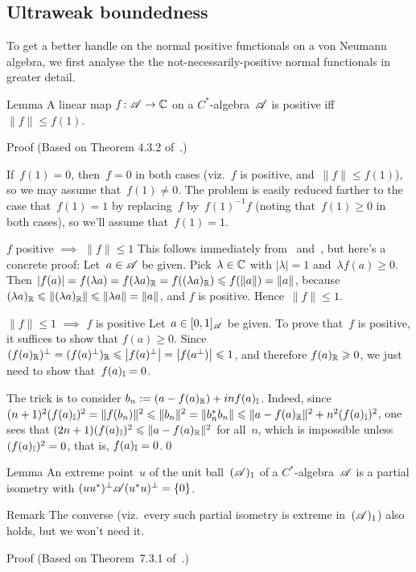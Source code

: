 \documentclass[a]{subfiles}
\begin{document}
\subsection{Ultraweak boundedness}
\begin{parsec}%
\begin{point}%
To get a better handle on the normal positive functionals
on a von Neumann algebra,
we first analyse the the not-necessarily-positive normal functionals
in greater detail.
\end{point}
\begin{point}{Lemma}%
A linear map $f\colon \mathscr{A}\to \mathbb{C}$
on a $C^*$-algebra~$\mathscr{A}$
is positive iff $\|f\|\leq f(1)$.
\begin{point}{Proof}%
(Based on Theorem 4.3.2 of~\cite{kr}.)

If~$f(1)=0$, then~$f=0$ in both cases 
(viz.~$f$ is positive, and~$\|f\|\leq f(1)$),
so
we may assume that~$f(1)\neq 0$.
The problem is easily reduced farther to the case 
that~$f(1)=1$
by replacing~$f$ by~$f(1)^{-1}f$
(noting that~$f(1)\geq 0$ in both cases),
so we'll assume that~$f(1)=1$.

\begin{point}{$f$ positive $\implies$ $\|f\|\leq 1$}%
This follows
immediately from~ and~,
but here's a concrete proof:
Let~$a\in \mathscr{A}$ be given.
Pick~$\lambda\in \mathbb{C}$ with $\left|\lambda\right|=1$
and~$\lambda f(a)\geq 0$.
Then $\left|f(a)\right|=f(\lambda a) 
= f(\lambda a)_{\mathbb{R}}
= f((\lambda a)_{\mathbb{R}})
\leqslant f(\|a\|)=\|a\|$,
because $(\lambda a)_{\mathbb{R}}
\leqslant \|(\lambda a)_{\mathbb{R}}\|
\leqslant \|\lambda a\|=\|a\|$,
and $f$ is positive.
Hence~$\|f\|\leq 1$.
\end{point}
\begin{point}{$\|f\|\leq 1$ $\implies$ $f$ is positive}%
Let~$a\in [0,1]_{\mathscr{A}}$ be given.
To prove that~$f$ is positive, it suffices to show that $f(a)\geq 0$.
Since $(f(a)_{\mathbb{R}})^\perp
=(f(a)^\perp)_{\mathbb{R}}
\leqslant \left|f(a)^\perp \right|
=\left|f(a^\perp)\right|\leqslant 1$,
and therefore $f(a)_{\mathbb{R}}\geqslant 0$,
we just need to show that~$f(a)_{\mathbb{I}}=0$.

The trick is to consider $b_n := (a - f(a)_{\mathbb{R}})+inf(a)_{\mathbb{I}}$.
Indeed, since $(n+1)^2(f(a)_{\mathbb{I}})^2
= \|f(b_n)\|^2 \leqslant \|b_n\|^2 = 
\|b_n^*b_n\| \leqslant \|a-f(a)_{\mathbb{R}}\|^2 + n^2(f(a)_{\mathbb{I}})^2$,
one sees that $(2n+1)(f(a)_{\mathbb{I}})^2\leqslant \|a-f(a)_{\mathbb{R}}\|^2$
for all~$n$,
which is impossible unless~$(f(a)_{\mathbb{I}})^2=0$,
that is, $f(a)_{\mathbb{I}}=0$.\qed
\end{point}
\end{point}
\end{point}
\begin{point}{Lemma}%
An extreme point~$u$ of the unit ball~$(\mathscr{A})_1$
of a $C^*$-algebra~$\mathscr{A}$
is a partial isometry with $(uu^*)^\perp\mathscr{A}(u^*u)^\perp = \{0\}$.
\begin{point}{Remark}%
The converse (viz.~every such partial isometry
is extreme in~$(\mathscr{A})_1$)
also holds, but we won't need it.
\end{point}
\begin{point}{Proof}%
(Based on Theorem~7.3.1 of~\cite{kr}.)


\end{point}
\end{point}
\end{parsec}
\end{document}
